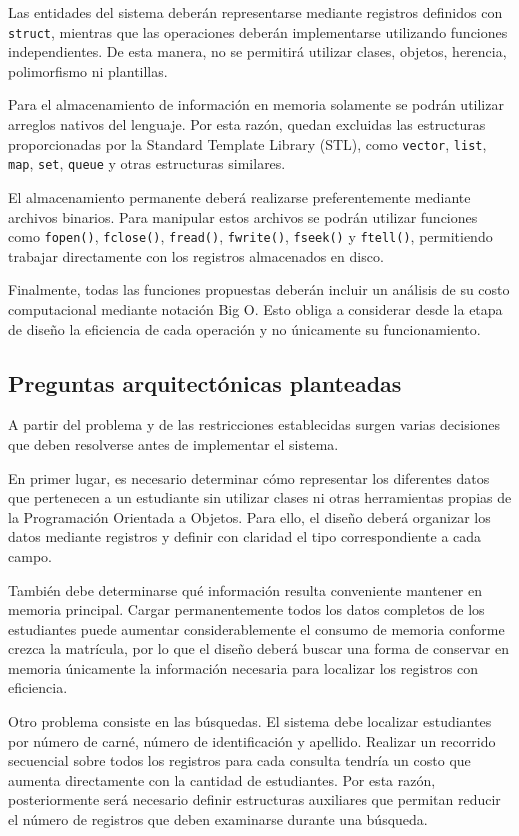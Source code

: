 Las entidades del sistema deberán representarse mediante registros
definidos con \texttt{struct}, mientras que las operaciones deberán
implementarse utilizando funciones independientes. De esta manera, no se
permitirá utilizar clases, objetos, herencia, polimorfismo ni plantillas.

Para el almacenamiento de información en memoria solamente se podrán
utilizar arreglos nativos del lenguaje. Por esta razón, quedan excluidas
las estructuras proporcionadas por la Standard Template Library (STL),
como \texttt{vector}, \texttt{list}, \texttt{map}, \texttt{set},
\texttt{queue} y otras estructuras similares.

El almacenamiento permanente deberá realizarse preferentemente mediante
archivos binarios. Para manipular estos archivos se podrán utilizar
funciones como \texttt{fopen()}, \texttt{fclose()}, \texttt{fread()},
\texttt{fwrite()}, \texttt{fseek()} y \texttt{ftell()}, permitiendo
trabajar directamente con los registros almacenados en disco.

Finalmente, todas las funciones propuestas deberán incluir un análisis
de su costo computacional mediante notación Big O. Esto obliga a
considerar desde la etapa de diseño la eficiencia de cada operación y no
únicamente su funcionamiento.

\subsection{Preguntas arquitectónicas planteadas}

A partir del problema y de las restricciones establecidas surgen varias
decisiones que deben resolverse antes de implementar el sistema.

En primer lugar, es necesario determinar cómo representar los diferentes
datos que pertenecen a un estudiante sin utilizar clases ni otras
herramientas propias de la Programación Orientada a Objetos. Para ello,
el diseño deberá organizar los datos mediante registros y definir con
claridad el tipo correspondiente a cada campo.

También debe determinarse qué información resulta conveniente mantener
en memoria principal. Cargar permanentemente todos los datos completos
de los estudiantes puede aumentar considerablemente el consumo de
memoria conforme crezca la matrícula, por lo que el diseño deberá buscar
una forma de conservar en memoria únicamente la información necesaria
para localizar los registros con eficiencia.

Otro problema consiste en las búsquedas. El sistema debe localizar
estudiantes por número de carné, número de identificación y apellido.
Realizar un recorrido secuencial sobre todos los registros para cada
consulta tendría un costo que aumenta directamente con la cantidad de
estudiantes. Por esta razón, posteriormente será necesario definir
estructuras auxiliares que permitan reducir el número de registros que
deben examinarse durante una búsqueda.

